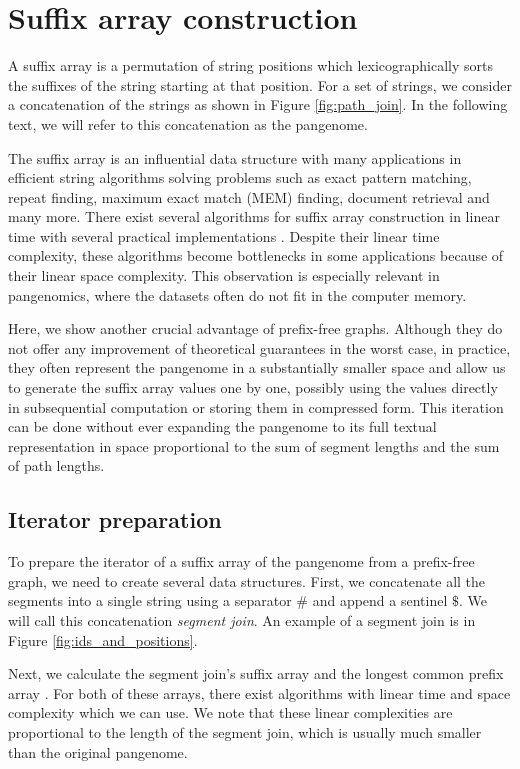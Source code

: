 \section{Suffix array construction}
A suffix array is a permutation of string positions which lexicographically sorts the suffixes of the string starting at that position.
For a set of strings, we consider a concatenation of the strings as shown in Figure \ref{fig:path_join}.
In the following text, we will refer to this concatenation as the pangenome.

The suffix array is an influential data structure with many applications in efficient string algorithms solving problems such as exact pattern matching, repeat finding, maximum exact match (MEM) finding, document retrieval and many more.
There exist several algorithms for suffix array construction in linear time \cite{skew2003karkkainen,sais2009nong,saoverview2007puglisi} with several practical implementations \cite{louza2017inducing,libdivsufsort}.
Despite their linear time complexity, these algorithms become bottlenecks in some applications because of their linear space complexity.
This observation is especially relevant in pangenomics, where the datasets often do not fit in the computer memory.

Here, we show another crucial advantage of prefix-free graphs.
Although they do not offer any improvement of theoretical guarantees in the worst case, in practice, they often represent the pangenome in a substantially smaller space and allow us to generate the suffix array values one by one, possibly using the values directly in subsequential computation or storing them in compressed form.
This iteration can be done without ever expanding the pangenome to its full textual representation in space proportional to the sum of segment lengths and the sum of path lengths.

\subsection{Iterator preparation}
To prepare the iterator of a suffix array of the pangenome from a prefix-free graph, we need to create several data structures.
First, we concatenate all the segments into a single string using a separator $\texttt{\#}$ and append a sentinel $\texttt{\$}$.
We will call this concatenation \emph{segment join}.
An example of a segment join is in Figure \ref{fig:ids_and_positions}.

Next, we calculate the segment join's suffix array and the longest common prefix array \cite{landau2001linear,manzini2004two}.
For both of these arrays, there exist algorithms with linear time and space complexity which we can use.
We note that these linear complexities are proportional to the length of the segment join, which is usually much smaller than the original pangenome.

